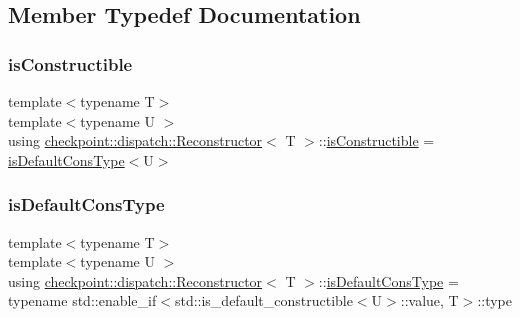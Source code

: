 \subsection{Member Typedef Documentation}
\mbox{\label{structcheckpoint_1_1dispatch_1_1_reconstructor_a580580febf5689aeffcc477d304aa469}} 
\subsubsection{\texorpdfstring{is\+Constructible}{isConstructible}}
{\footnotesize\ttfamily template$<$typename T$>$ \\
template$<$typename U $>$ \\
using \hyperlink{structcheckpoint_1_1dispatch_1_1_reconstructor}{checkpoint\+::dispatch\+::\+Reconstructor}$<$ T $>$\+::\hyperlink{structcheckpoint_1_1dispatch_1_1_reconstructor_a580580febf5689aeffcc477d304aa469}{is\+Constructible} =  \hyperlink{structcheckpoint_1_1dispatch_1_1_reconstructor_ae91135a7a24b1008e7f184271fbc35d8}{is\+Default\+Cons\+Type}$<$U$>$}

\mbox{\label{structcheckpoint_1_1dispatch_1_1_reconstructor_ae91135a7a24b1008e7f184271fbc35d8}} 
\subsubsection{\texorpdfstring{is\+Default\+Cons\+Type}{isDefaultConsType}}
{\footnotesize\ttfamily template$<$typename T$>$ \\
template$<$typename U $>$ \\
using \hyperlink{structcheckpoint_1_1dispatch_1_1_reconstructor}{checkpoint\+::dispatch\+::\+Reconstructor}$<$ T $>$\+::\hyperlink{structcheckpoint_1_1dispatch_1_1_reconstructor_ae91135a7a24b1008e7f184271fbc35d8}{is\+Default\+Cons\+Type} =  typename std\+::enable\+\_\+if$<$std\+::is\+\_\+default\+\_\+constructible$<$U$>$\+::value, T$>$\+::type}

